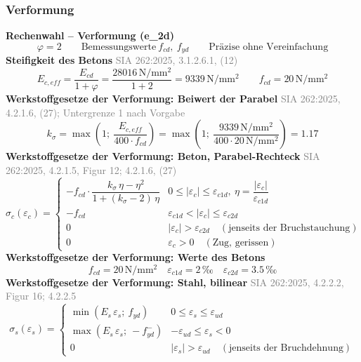 \documentclass[11pt,a4paper]{article}
\newcommand{\normref}[1]{{\small\textcolor{gray}{#1}}}
\begin{document}
\subsubsection{Verformung}
\noindent\textbf{Rechenwahl – Verformung (e\_2d)}
\begin{equation*}
\varphi = 2 \qquad \text{Bemessungswerte}\ f_{cd},\ f_{yd} \qquad \text{Präzise ohne Vereinfachung}
\end{equation*}
\noindent\textbf{Steifigkeit des Betons} \hfill \normref{SIA 262:2025, 3.1.2.6.1, (12)}
\begin{equation*}
E_{c,eff} = \frac{E_{cd}}{1 + \varphi} = \frac{28016\,\mathrm{N}/\mathrm{mm}^{2}}{1 + 2} = 9339\,\mathrm{N}/\mathrm{mm}^{2} \qquad f_{cd} = 20\,\mathrm{N}/\mathrm{mm}^{2}
\end{equation*}
\noindent\textbf{Werkstoffgesetze der Verformung: Beiwert der Parabel} \hfill \normref{SIA 262:2025, 4.2.1.6, (27); Untergrenze 1 nach Vorgabe}
\begin{equation*}
k_{\sigma} = \max\left(1;\ \frac{E_{c,eff}}{400 \cdot f_{cd}}\right) = \max\left(1;\ \frac{9339\,\mathrm{N}/\mathrm{mm}^{2}}{400 \cdot 20\,\mathrm{N}/\mathrm{mm}^{2}}\right) = 1.17
\end{equation*}
\noindent\textbf{Werkstoffgesetze der Verformung: Beton, Parabel-Rechteck} \hfill \normref{SIA 262:2025, 4.2.1.5, Figur 12; 4.2.1.6, (27)}
\begin{equation*}
\sigma_c(\varepsilon_c) = \begin{cases} -f_{cd} \cdot \dfrac{k_\sigma\,\eta - \eta^2}{1 + (k_\sigma - 2)\,\eta} & 0 \le |\varepsilon_c| \le \varepsilon_{c1d},\ \eta = \dfrac{|\varepsilon_c|}{\varepsilon_{c1d}} \\[2ex] -f_{cd} & \varepsilon_{c1d} < |\varepsilon_c| \le \varepsilon_{c2d} \\[1ex] 0 & |\varepsilon_c| > \varepsilon_{c2d} \quad (\text{jenseits der Bruchstauchung}) \\[1ex] 0 & \varepsilon_c > 0 \quad (\text{Zug, gerissen}) \end{cases}
\end{equation*}
\noindent\textbf{Werkstoffgesetze der Verformung: Werte des Betons}
\begin{equation*}
f_{cd} = 20\,\mathrm{N}/\mathrm{mm}^{2} \quad \varepsilon_{c1d} = 2\,\text{‰} \quad \varepsilon_{c2d} = 3.5\,\text{‰}
\end{equation*}
\noindent\textbf{Werkstoffgesetze der Verformung: Stahl, bilinear} \hfill \normref{SIA 262:2025, 4.2.2.2, Figur 16; 4.2.2.5}
\begin{equation*}
\sigma_s(\varepsilon_s) = \begin{cases} \min(E_s\,\varepsilon_s;\ f_{yd}) & 0 \le \varepsilon_s \le \varepsilon_{ud} \\[1ex] \max(E_s\,\varepsilon_s;\ -f_{yd}^{-}) & -\varepsilon_{ud} \le \varepsilon_s < 0 \\[1ex] 0 & |\varepsilon_s| > \varepsilon_{ud} \quad (\text{jenseits der Bruchdehnung}) \end{cases}
\end{equation*}
\end{document}
